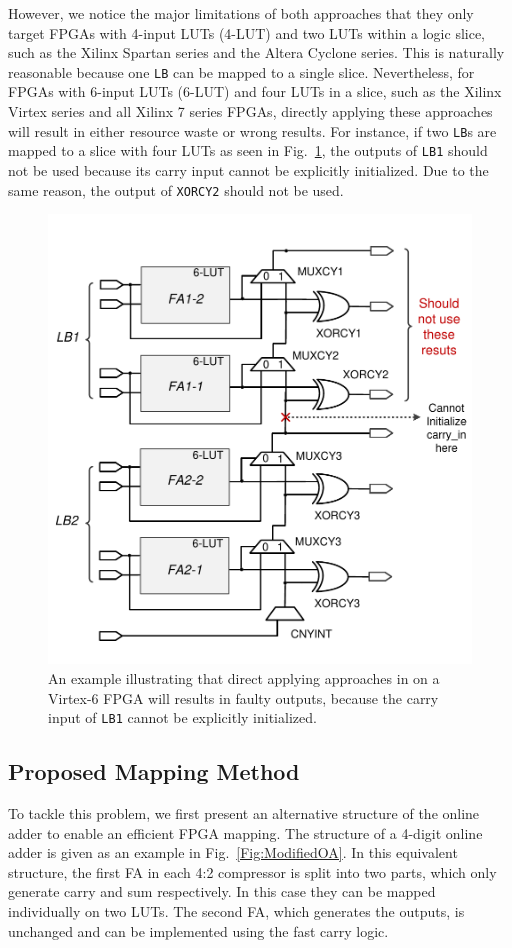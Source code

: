 \documentclass[conference]{IEEEtran}
\begin{document}
However, we notice the major limitations of both approaches that they only target FPGAs with 4-input LUTs (4-LUT) and two LUTs within a logic slice, such as the Xilinx Spartan series and the Altera Cyclone series. This is naturally reasonable because one \texttt{LB} can be mapped to a single slice. Nevertheless, for FPGAs with 6-input LUTs (6-LUT) and four LUTs in a slice, such as the Xilinx Virtex series and all Xilinx 7 series FPGAs, directly applying these approaches will result in either resource waste or wrong results. For instance, if two \texttt{LB}s are mapped to a slice with four LUTs as seen in Fig.~\ref{Fig:PreWorkVirtex6}, the outputs of \texttt{LB1} should not be used because its carry input cannot be explicitly initialized. Due to the same reason, the output of \texttt{XORCY2} should not be used.\vspace{-0.5ex}
%
\begin{figure}[tbp]
	\centering
	\includegraphics[width=.45\textwidth]{./Figures/SDadder_FastCarry_PreviousWork2.pdf}
	\vspace{-3ex}
	\caption{An example illustrating that direct applying approaches in \cite{FPT09RA} on a Virtex-6 FPGA will results in faulty outputs, because the carry input of \texttt{LB1} cannot be explicitly initialized.}
	\label{Fig:PreWorkVirtex6}
    \vspace{-2.5ex}
\end{figure}

\subsection{Proposed Mapping Method}\vspace{-0.5ex}
To tackle this problem, we first present an alternative structure of the online adder to enable an efficient FPGA mapping. The structure of a 4-digit online adder is given as an example in Fig.~\ref{Fig:ModifiedOA}. In this equivalent structure, the first FA in each 4:2 compressor is split into two parts, which only generate carry and sum respectively. In this case they can be mapped individually on two LUTs. The second FA, which generates the outputs, is unchanged and can be implemented using the fast carry logic.\vspace{-0.5ex}
\end{document}
